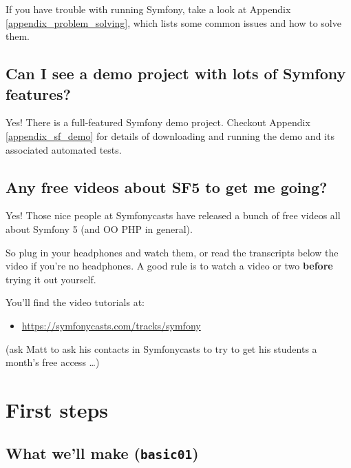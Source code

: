 \documentclass[a4paperpaper,openright]{book}
\providecommand{\tightlist}{%
  \setlength{\itemsep}{0pt}\setlength{\parskip}{0pt}}
\begin{document}
If you have trouble with running Symfony, take a look at Appendix
\ref{appendix_problem_solving}, which lists some common issues and how
to solve them.

\hypertarget{can-i-see-a-demo-project-with-lots-of-symfony-features}{%
\section{Can I see a demo project with lots of Symfony
features?}\label{can-i-see-a-demo-project-with-lots-of-symfony-features}}

Yes! There is a full-featured Symfony demo project. Checkout Appendix
\ref{appendix_sf_demo} for details of downloading and running the demo
and its associated automated tests.

\hypertarget{any-free-videos-about-sf5-to-get-me-going}{%
\section{Any free videos about SF5 to get me
going?}\label{any-free-videos-about-sf5-to-get-me-going}}

Yes! Those nice people at Symfonycasts have released a bunch of free
videos all about Symfony 5 (and OO PHP in general).

So plug in your headphones and watch them, or read the transcripts below
the video if you're no headphones. A good rule is to watch a video or
two \textbf{before} trying it out yourself.

You'll find the video tutorials at:

\begin{itemize}
\tightlist
\item
  \url{https://symfonycasts.com/tracks/symfony}
\end{itemize}

(ask Matt to ask his contacts in Symfonycasts to try to get his students
a month's free access \ldots{})

\hypertarget{first-steps}{%
\chapter{First steps}\label{first-steps}}

\hypertarget{what-well-make-basic01}{%
\section{\texorpdfstring{What we'll make
(\texttt{basic01})}{What we'll make (basic01)}}\label{what-well-make-basic01}}
\end{document}

